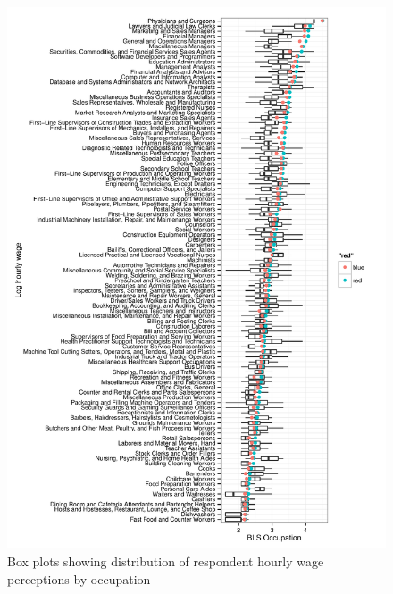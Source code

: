 \documentclass[11pt]{article}
\begin{document}
\begin{figure}
\caption{Box plots showing distribution of respondent hourly wage perceptions by occupation \label{fig:by_occupation_boxplots}} 
\centering 
\includegraphics[width = \linewidth]{./plots/box_plots_by_occupation.pdf} 
\end{figure} 
\end{document}
